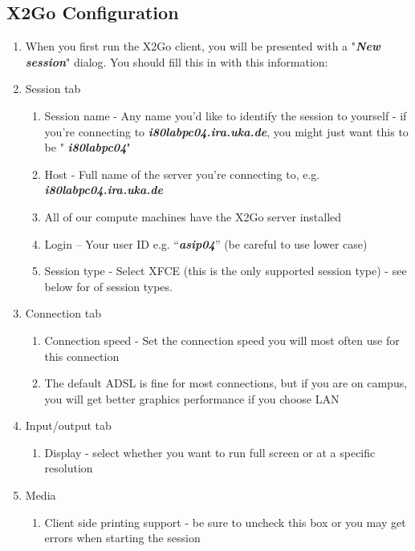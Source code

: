 \subsection{X2Go Configuration}
\begin{enumerate}[resume]
	\item
	When you first run the X2Go client, you will be presented with a
	"\emph{\textbf{New session}}" dialog. You should fill this in with
	this information:
	\item
	Session tab
		\begin{enumerate}[label*=\arabic*.]
		\item
		Session name - Any name you'd like to identify the session to
		yourself - if you're connecting to
		\emph{\textbf{i80labpc04.ira.uka.de}}, you might just want this to
		be " \emph{\textbf{i80labpc04}}"
		\item
		Host - Full name of the server you're connecting to, e.g.
		\emph{\textbf{i80labpc04.ira.uka.de}}
		\item
		All of our compute machines have the X2Go server installed
		\item
		Login -- Your user ID e.g. ``\emph{\textbf{asip04}}'' (be careful to
		use lower case)
		\item
		Session type - Select XFCE (this is the only supported session type)
		- see below for of session types.
	\end{enumerate}
	\item
	Connection tab
	\begin{enumerate}[label*=\arabic*.]
		\item
		Connection speed - Set the connection speed you will most often use
		for this connection
		\item
		The default ADSL is fine for most connections, but if you are on
		campus, you will get better graphics performance if you choose LAN
	\end{enumerate}
	\item
	Input/output tab
	\begin{enumerate}[label*=\arabic*.]
		\item
		Display - select whether you want to run full screen or at a
		specific resolution
	\end{enumerate}
	\item
	Media
	\begin{enumerate}[label*=\arabic*.]
		\def\labelenumii{\arabic{enumii}.}
		\item
		Client side printing support - be sure to uncheck this box or you
		may get errors when starting the session
	\end{enumerate}
\end{enumerate}

